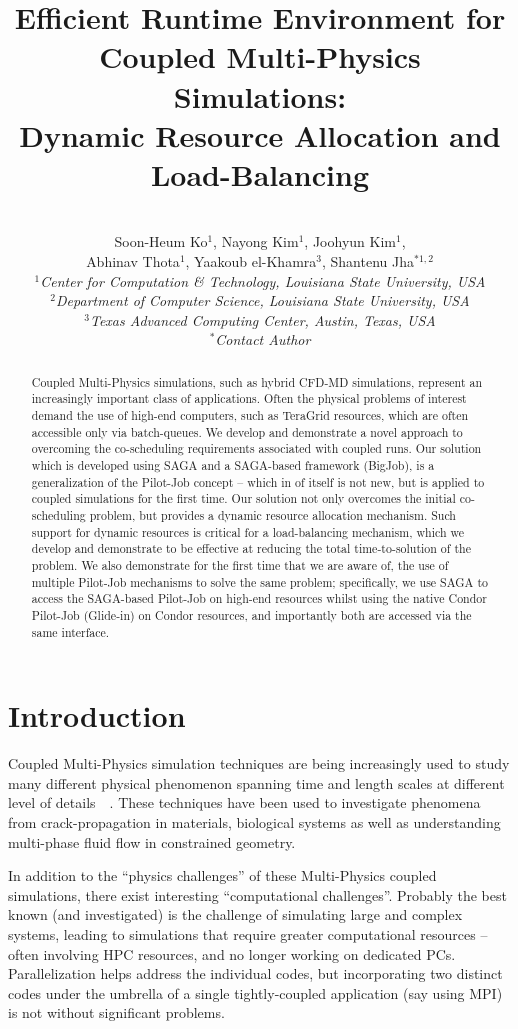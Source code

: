 \documentclass[conference,final]{IEEEtran}
\title{Efficient Runtime Environment for Coupled Multi-Physics Simulations: \\
Dynamic Resource Allocation and Load-Balancing}
\author{
 ~\\[-2em]
 Soon-Heum Ko$^{1}$, Nayong Kim$^{1}$, Joohyun Kim$^{1}$, \\ Abhinav Thota$^{1}$, Yaakoub el-Khamra$^{3}$, Shantenu Jha$^{*1,2}$\\
 \small{\emph{$^{1}$Center for Computation \& Technology, Louisiana State University, USA}}\\
 \small{\emph{$^{2}$Department of Computer Science, Louisiana State University, USA}}\\
 \small{\emph{$^{3}$Texas Advanced Computing Center, Austin, Texas, USA}}\\
 \small{\emph{$^{*}$Contact Author}}\\
}
\newcommand{\jhanote}[1]{ {\textcolor{red} { ***Jha: #1 }}}
\newcommand{\jhanote}[1]{}
\newcommand{\up}{\vspace*{-1em}}
\begin{document}
\maketitle

\begin{abstract}
 Coupled Multi-Physics simulations, such as hybrid CFD-MD simulations, represent an increasingly important class of applications.  Often the physical problems of interest demand the use of high-end computers, such as TeraGrid resources, which are often accessible only via batch-queues.  We develop and demonstrate a novel approach to overcoming the co-scheduling requirements associated with coupled runs.  Our solution which is developed using SAGA and a SAGA-based framework (BigJob), is a generalization of the Pilot-Job concept -- which in of itself is not new, but is applied to coupled simulations for the first time.  Our solution not only overcomes the initial co-scheduling problem, but provides a dynamic resource allocation mechanism. Such support for dynamic resources is critical for a load-balancing mechanism, which we develop and demonstrate to be effective at reducing the total time-to-solution of the problem.  We also demonstrate for the first time that we are aware of, the use of multiple Pilot-Job mechanisms to solve the same problem; specifically, we use SAGA to access the SAGA-based Pilot-Job on high-end resources whilst using the native Condor Pilot-Job (Glide-in) on Condor resources, and importantly both are accessed via the same interface.
\end{abstract}
\up\up 

\section{Introduction}

Coupled Multi-Physics simulation techniques are being increasingly used to study many different physical phenomenon spanning time and length scales at different level of details~\cite{Tai}~\cite{Watanabe}. These techniques have been used to investigate phenomena from crack-propagation in materials, biological systems as well as understanding multi-phase fluid flow in constrained geometry.

In addition to the ``physics challenges'' of these Multi-Physics coupled simulations, there exist interesting ``computational challenges''.  Probably the best known (and investigated) is the challenge of simulating large and complex systems, leading to simulations that require greater computational resources -- often involving HPC resources, and no longer working on dedicated PCs. Parallelization helps address the individual codes, but incorporating two distinct codes under the umbrella of a single tightly-coupled application (say using MPI) is not without significant problems.  %
\end{document}
